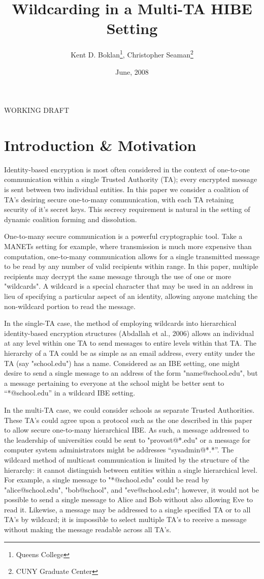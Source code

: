 \documentclass[10pt]{article}
\title{\textbf{Wildcarding in a Multi-TA HIBE Setting}}
\author{Kent D. Boklan\footnote{Queens College}, Christopher Seaman\footnote{CUNY Graduate Center}}
\date{June, 2008}
\begin{document}
\maketitle

\begin{center}{\textrm{WORKING DRAFT}}\end{center}
\section*{Introduction \& Motivation}
Identity-based encryption is most often considered in the context of one-to-one communication within a single Trusted Authority (TA); every encrypted message is sent between two individual entities.  In this paper we consider a coalition of TA's desiring secure one-to-many communication, with each TA retaining security of it's secret keys.  This secrecy requirement is natural in the setting of dynamic coalition forming and dissolution.

One-to-many secure communication is a powerful cryptographic tool.  Take a MANETs setting for example, where transmission is much more expensive than computation, one-to-many communication allows for a single transmitted message to be read by any number of valid recipients within range.  In this paper, multiple recipients may decrypt the same message through the use of one or more "wildcards". A wildcard is a special character that may be used in an address in lieu of specifying a particular aspect of an identity, allowing anyone matching the non-wildcard portion to read the message.

In the single-TA case, the method of employing wildcards into hierarchical identity-based encryption structures (Abdallah et al., 2006) allows an individual at any level within one TA to send messages to entire levels within that TA.  The hierarchy of a TA could be as simple as an email address, every entity under the TA (say "school.edu") has a name. Considered as an IBE setting, one might desire to send a single message to an address of the form "name@school.edu", but a message pertaining to everyone at the school might be better sent to “*@school.edu” in a wildcard IBE setting. 

In the multi-TA case, we could consider schools as separate Trusted Authorities.  These TA's could agree upon a protocol such as the one described in this paper to allow secure one-to-many hierarchical IBE.  As such, a message addressed to the leadership of universities could be sent to "provost@*.edu" or a message for computer system administrators might be addresses “sysadmin@*.*”.  The wildcard method of multicast communication is limited by the structure of the hierarchy: it cannot distinguish between entities within a single hierarchical level.  For example, a single message to "*@school.edu" could be read by "alice@school.edu", "bob@school", and "eve@school.edu"; however, it would not be possible to send a single message to Alice and Bob without also allowing Eve to read it. Likewise, a message may be addressed to a single specified TA or to all TA's by wildcard; it is impossible to select multiple TA's to receive a message without making the message readable across all TA's.
\end{document}
